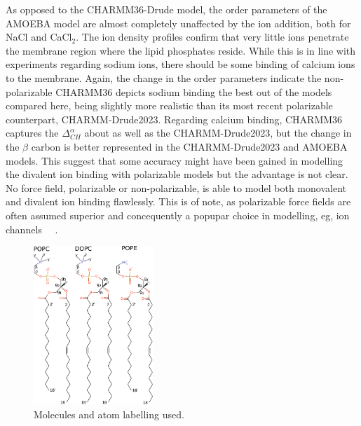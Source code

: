 \documentclass[journal=jacsat,manuscript=article,layout=singlecolumn]{achemso}
\begin{document}
As opposed to the CHARMM36-Drude model, the order parameters of the AMOEBA model are almost completely unaffected by the ion addition, both for NaCl and CaCl$_{2}$. The ion density profiles confirm that very little ions penetrate the membrane region where the lipid phosphates reside. While this is in line with experiments regarding sodium ions, there should be some binding of calcium ions to the membrane. Again, the change in the order parameters indicate the non-polarizable CHARMM36 depicts sodium binding the best out of the models compared here, being slightly more realistic than its most recent polarizable counterpart, CHARMM-Drude2023. Regarding calcium binding, CHARMM36 captures the $\Delta^{\alpha}_{CH}$ about as well as the CHARMM-Drude2023, but the change in the $\beta$ carbon is better represented in the CHARMM-Drude2023 and AMOEBA models. This suggest that some accuracy might have been gained in modelling the divalent ion binding with polarizable models but the advantage is not clear. No force field, polarizable or non-polarizable, is able to model both monovalent and divalent ion binding flawlessly. This is of note, as polarizable force fields are often assumed superior and concequently a popupar choice in modelling, eg, ion channels~\cite{sun2017 jing2019polarizable, klesse2020induced} ~.



\begin{figure}[t]
    \centering
    \includegraphics[width=0.4\textwidth]{Figures/molecules.pdf}
    \caption{Molecules and atom labelling used.}
    \label{fig:molecules}

\end{figure}
\end{document}
